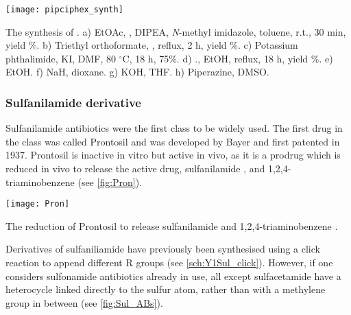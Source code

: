 \begin{scheme}[H]
	\begin{center}
		\texttt{[image: pipciphex\_synth]}
		\caption{The synthesis of .
		a) EtOAc, , DIPEA, \textit{N}-methyl imidazole, toluene, r.t., 30 min, yield \%.
		b) Triethyl orthoformate, , reflux, 2 h, yield \%.
		c) Potassium phthalimide, KI, DMF, 80 $^{\circ}$C, 18 h, 75\%.
		d) ., EtOH, reflux, 18 h, yield \%.
		e) EtOH.
		f) NaH, dioxane.
		g) KOH, THF.
		h) Piperazine, DMSO.
		\label{sch:pipciphex_synth}}
	\end{center}
\end{scheme}

\subsubsection{Sulfanilamide derivative}

Sulfanilamide antibiotics were the first class to be widely used\cite{Otten1986,Wainwright2011}. The first drug in the class was called Prontosil  and was developed by Bayer and first patented in 1937. Prontosil  is inactive in vitro but active in vivo, as it is a prodrug which is reduced in vivo to release the active drug, sulfanilamide , and 1,2,4-triaminobenzene  (see \ref{fig:Pron}).



\begin{scheme}[H]
	\begin{center}
		\texttt{[image: Pron]}
		\caption{The reduction of Prontosil  to release sulfanilamide  and 1,2,4-triaminobenzene .
		\label{fig:Pron}}
	\end{center}
\end{scheme}

Derivatives of sulfaniliamide  have previously been synthesised using a click reaction to append different R groups\cite{Wang2010} (see \ref{sch:Y1Sul_click}). However, if one considers sulfonamide antibiotics already in use, all except sulfacetamide have a heterocycle linked directly to the sulfur atom, rather than with a methylene group in between (see \ref{fig:Sul_ABs}). 

